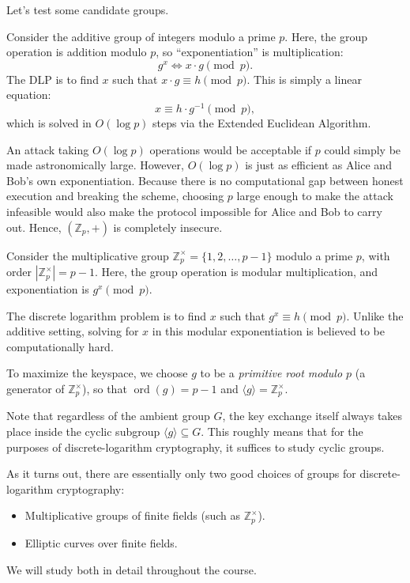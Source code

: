 Let's test some candidate groups.

\begin{example}
    Consider the additive group of integers modulo a prime \(p\).
    Here, the group operation is addition modulo \(p\), so ``exponentiation'' is multiplication:
    \[
        g^x \iff x \cdot g \pmod p.
    \]
    The DLP is to find \(x\) such that \(x \cdot g \equiv h \pmod p\).
    This is simply a linear equation:
    \[
        x \equiv h \cdot g^{-1} \pmod p,
    \]
    which is solved in \(O(\log p)\) steps via the Extended Euclidean Algorithm.

    An attack taking \(O(\log p)\) operations would be acceptable if \(p\) could simply be made astronomically large.
    However, \(O(\log p)\) is just as efficient as Alice and Bob's own exponentiation.
    Because there is no computational gap between honest execution and breaking the scheme, choosing \(p\) large enough to make the attack infeasible would also make the protocol impossible for Alice and Bob to carry out.
    Hence, \((\mathbb{Z}_p, +)\) is completely insecure.
\end{example}

\begin{example}
    Consider the multiplicative group \(\mathbb{Z}_p^\times = \{1, 2, \dots, p-1\}\) modulo a prime \(p\), with order \(|\mathbb{Z}_p^\times| = p - 1\).
    Here, the group operation is modular multiplication, and exponentiation is \(g^x \pmod p\).
    
    The discrete logarithm problem is to find \(x\) such that \(g^x \equiv h \pmod p\).
    Unlike the additive setting, solving for \(x\) in this modular exponentiation is believed to be computationally hard.

    To maximize the keyspace, we choose \(g\) to be a \emph{primitive root modulo \(p\)} (a generator of \(\mathbb{Z}_p^\times\)), so that \(\operatorname{ord}(g) = p - 1\) and \(\langle g \rangle = \mathbb{Z}_p^\times\).
\end{example}

Note that regardless of the ambient group \(G\), the key exchange itself always takes place inside the cyclic subgroup \(\langle g \rangle \subseteq G\).
This roughly means that for the purposes of discrete-logarithm cryptography, it suffices to study cyclic groups.

As it turns out, there are essentially only two good choices of groups for discrete-logarithm cryptography:
\begin{itemize}
    \item Multiplicative groups of finite fields (such as \(\mathbb{Z}_p^\times\)).
    \item Elliptic curves over finite fields.
\end{itemize}
We will study both in detail throughout the course.